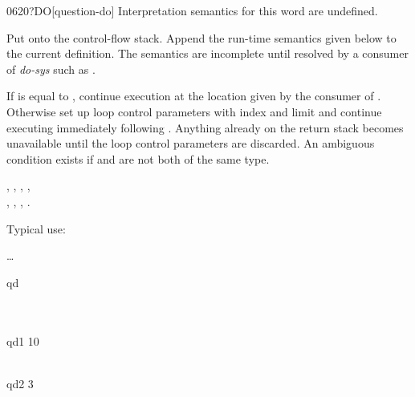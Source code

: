 \begin{worddef}[qDO]{0620}{?DO}[question-do]
\interpret
	Interpretation semantics for this word are undefined.

\compile

	Put  onto the control-flow stack. Append the
	run-time semantics given below to the current definition. The
	semantics are incomplete until resolved by a consumer of
	\emph{do-sys} such as .

\runtime

	If  is equal to , continue
	execution at the location given by the consumer of
	. Otherwise set up loop control parameters with
	index  and limit  and continue
	executing immediately following . Anything already
	on the return stack becomes unavailable until the loop
	control parameters are discarded. An ambiguous condition
	exists if  and  are not both of
	the same type.

\see {},
	,
	,
	, \\
	,
	,
	,
	.

	\begin{rationale} %
		Typical use:

		\tab {}  {\ldots}  
	\end{rationale}

	\begin{testing}\ttfamily

	\word{:} qd    \word{;} \\
	 \\
	 \\

	\word{:} qd1   10  \word{;} \\
	 \\

	\word{:} qd2   3        \word{;} \\


\end{testing}
\end{worddef}
